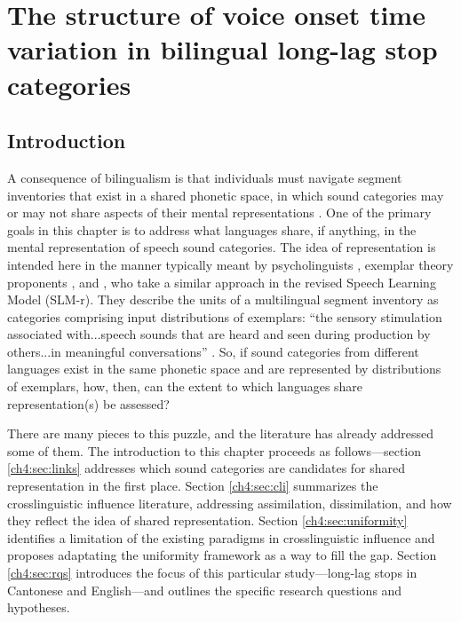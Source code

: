 \setcounter{chapter}{3}

\chapter{The structure of voice onset time variation in bilingual long-lag stop categories}\label{Uniformity}

\section{Introduction}\label{ch4:sec:intro}

A consequence of bilingualism is that individuals must navigate segment inventories that exist in a shared phonetic space, in which sound categories may or may not share aspects of their mental representations \citep{flege_2021_slmr}. One of the primary goals in this chapter is to address what languages share, if anything, in the mental representation of speech sound categories. The idea of representation is intended here in the manner typically meant by psycholinguists \citep[e.g.,][]{llompart_2018_acoustic}, exemplar theory proponents \citep[e.g.,][]{amengual_2018_laterals}, and \citet{flege_2021_slmr}, who take a similar approach in the revised Speech Learning Model (SLM-r). They describe the units of a multilingual segment inventory as categories comprising input distributions of exemplars: ``the sensory stimulation associated with...speech sounds that are heard and seen during production by others...in meaningful conversations'' \citep[][p. 32]{flege_2021_slmr}. So, if sound categories from different languages exist in the same phonetic space and are represented by distributions of exemplars, how, then, can the extent to which languages share representation(s) be assessed?

There are many pieces to this puzzle, and the literature has already addressed some of them. The introduction to this chapter proceeds as follows---section \ref{ch4:sec:links} addresses which sound categories are candidates for shared representation in the first place. Section \ref{ch4:sec:cli} summarizes the crosslinguistic influence literature, addressing assimilation, dissimilation, and how they reflect the idea of shared representation. Section \ref{ch4:sec:uniformity} identifies a limitation of the existing paradigms in crosslinguistic influence and proposes adaptating the uniformity framework as a way to fill the gap. Section \ref{ch4:sec:rqs} introduces the focus of this particular study---long-lag stops in Cantonese and English—and outlines the specific research questions and hypotheses.

